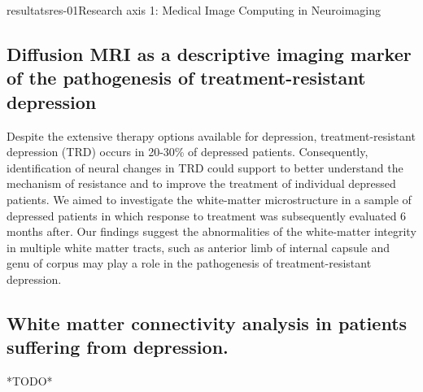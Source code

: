 \documentclass{ra2018}
\begin{document}
\begin{module}{resultats}{res-01}{Research axis 1: Medical Image Computing in Neuroimaging}
\subsection{Diffusion MRI as a descriptive imaging marker of the pathogenesis of treatment-resistant depression}
\begin{participants}
\end{participants}
Despite the extensive therapy options available for depression, treatment-resistant depression (TRD) occurs in 20-30\% of depressed patients. Consequently, identification of neural changes in TRD could support to better understand the mechanism of resistance and to improve the treatment of individual depressed patients. We aimed to investigate the white-matter microstructure in a sample of depressed patients in which response to treatment was subsequently evaluated 6 months after. Our findings suggest the abnormalities of the white-matter integrity in multiple white matter tracts, such as anterior limb of internal capsule and genu of corpus may play a role in the pathogenesis of treatment-resistant depression.~\cite{coloigner:hal-01812087}

\subsection{White matter connectivity analysis in patients suffering from depression.
}
\begin{participants}
\end{participants}
*TODO*~\cite{coloigner:hal-01890087}

\end{module}
\end{document}
